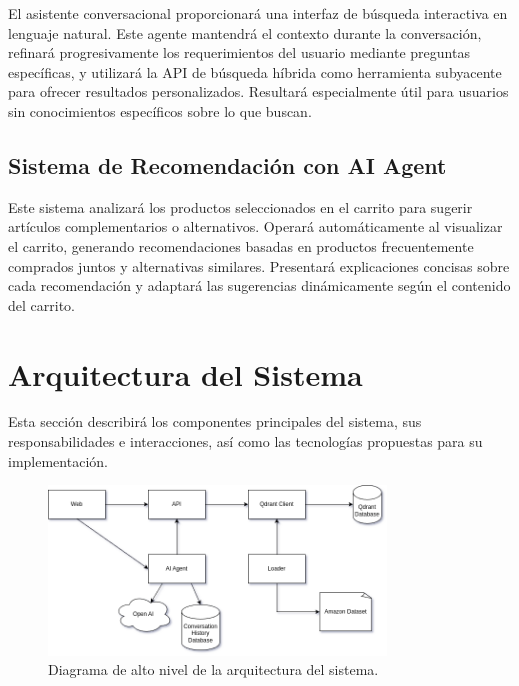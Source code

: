 \documentclass[12pt]{article}
\begin{document}
El asistente conversacional proporcionará una interfaz de búsqueda interactiva en lenguaje natural. Este agente mantendrá el contexto durante la conversación, refinará progresivamente los requerimientos del usuario mediante preguntas específicas, y utilizará la API de búsqueda híbrida como herramienta subyacente para ofrecer resultados personalizados. Resultará especialmente útil para usuarios sin conocimientos específicos sobre lo que buscan.

\subsection{Sistema de Recomendación con AI Agent}

Este sistema analizará los productos seleccionados en el carrito para sugerir artículos complementarios o alternativos. Operará automáticamente al visualizar el carrito, generando recomendaciones basadas en productos frecuentemente comprados juntos y alternativas similares. Presentará explicaciones concisas sobre cada recomendación y adaptará las sugerencias dinámicamente según el contenido del carrito.

\newpage

\section{Arquitectura del Sistema}

Esta sección describirá los componentes principales del sistema, sus responsabilidades e interacciones, así como las tecnologías propuestas para su implementación.

\vspace{1cm}

\begin{figure}[H]
    \centering
    \includegraphics[width=0.8\textwidth]{architecture.png}
    \caption{Diagrama de alto nivel de la arquitectura del sistema.}
    \label{fig:system_architecture}
\end{figure}
\end{document}
